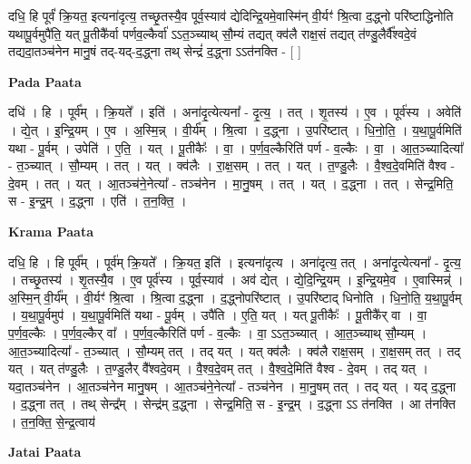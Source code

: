 \documentclass[17pt]{extarticle}
\begin{document}
दधि॒ हि पूर्वं॑ क्रि॒यत॒ इत्यना॑दृत्य॒ तच्छृ॒तस्यै॒व पूर्व॒स्याव॑ द्येदिन्द्रि॒यमे॒वास्मि॑न् वी॒र्यꣳ॑ श्रि॒त्वा द॒द्ध्नो परि॑ष्टाद्धिनोति यथापू॒र्वमुपै॑ति॒ यत् पू॒तीकै᳚र्वा पर्णव॒ल्कैर्वा॑ ऽऽत॒ञ्च्याथ् सौ॒म्यं तद्यत् क्व॑लै राक्ष॒सं तद्यत् त॑ण्डु॒लैर्वै᳚श्वदे॒वं तद्यदा॒तञ्च॑नेन मानु॒षं तद्-यद्-द॒द्ध्ना तथ् सेन्द्रं॑ द॒द्ध्ना ऽऽत॑नक्ति - [  ] \newline

\textbf{Pada Paata} \newline

दधि॑ । हि । पूर्व᳚म् । क्रि॒यते᳚ । इति॑ । अना॑दृ॒त्येत्यना᳚ - दृ॒त्य॒ । तत् । शृ॒तस्य॑ । ए॒व । पूर्व॑स्य । अवेति॑ । द्ये॒त् । इ॒न्द्रि॒यम् । ए॒व । अ॒स्मि॒न्न् । वी॒र्य᳚म् । श्रि॒त्वा । द॒द्ध्ना । उ॒परि॑ष्टात् । धि॒नो॒ति॒ । य॒था॒पू॒र्वमिति॑ यथा - पू॒र्वम् । उपेति॑ । ए॒ति॒ । यत् । पू॒तीकैः᳚ । वा॒ । प॒र्ण॒व॒ल्कैरिति॑ पर्ण - व॒ल्कैः । वा॒ । आ॒त॒ञ्च्यादित्या᳚ - त॒ञ्च्यात् । सौ॒म्यम् । तत् । यत् । क्व॑लैः । रा॒क्ष॒सम् । तत् । यत् । त॒ण्डु॒लैः । वै॒श्व॒दे॒वमिति॑ वैश्व - दे॒वम् । तत् । यत् । आ॒तञ्च॑ने॒नेत्या᳚ - तञ्च॑नेन । मा॒नु॒षम् । तत् । यत् । द॒द्ध्ना । तत् । सेन्द्र॒मिति॒ स - इ॒न्द्र॒म् । द॒द्ध्ना । एति॑ । त॒न॒क्ति॒ ।  \newline


\textbf{Krama Paata} \newline

दधि॒ हि । हि पूर्व᳚म् । पूर्व॑म् क्रि॒यते᳚ । क्रि॒यत॒ इति॑ । इत्यना॑दृत्य । अना॑दृत्य॒ तत् । अना॑दृ॒त्येत्यना᳚ - दृ॒त्य॒ । तच्छृ॒तस्य॑ । शृ॒तस्यै॒व । ए॒व पूर्व॑स्य । पूर्व॒स्याव॑ । अव॑ द्येत् । द्ये॒दि॒न्द्रि॒यम् । इ॒न्द्रि॒यमे॒व । ए॒वास्मिन्न्॑ । अ॒स्मि॒न् वी॒र्य᳚म् । वी॒र्यꣳ॑ श्रि॒त्वा । श्रि॒त्वा द॒द्ध्ना । द॒द्ध्नोपरि॑ष्टात् । उ॒परि॑ष्टाद् धिनोति । धि॒नो॒ति॒ य॒था॒पू॒र्वम् । य॒था॒पू॒र्वमुप॑ । य॒था॒पू॒र्वमिति॑ यथा - पू॒र्वम् । उपै॑ति । ए॒ति॒ यत् । यत् पू॒तीकैः᳚ । पू॒तीकै᳚र् वा । वा॒ प॒र्ण॒व॒ल्कैः । प॒र्ण॒व॒ल्कैर् वा᳚ । प॒र्ण॒व॒ल्कैरिति॑ पर्ण - व॒ल्कैः । वा॒ ऽऽत॒ञ्च्यात् । आ॒त॒ञ्च्याथ् सौ॒म्यम् । आ॒त॒ञ्च्यादित्या᳚ - त॒ञ्च्यात् । सौ॒म्यम् तत् । तद् यत् । यत् क्व॑लैः । क्व॑लै राक्ष॒सम् । रा॒क्ष॒सम् तत् । तद् यत् । यत् त॑ण्डु॒लैः । त॒ण्डु॒लैर् वै᳚श्वदे॒वम् । वै॒श्व॒दे॒वम् तत् । वै॒श्व॒दे॒मिति॑ वैश्व - दे॒वम् । तद् यत् । यदा॒तञ्च॑नेन । आ॒तञ्च॑नेन मानु॒षम् । आ॒तञ्च॑ने॒नेत्या᳚ - तञ्च॑नेन । मा॒नु॒षम् तत् । तद् यत् । यद् द॒द्ध्ना । द॒द्ध्ना तत् । तथ् सेन्द्र᳚म् । सेन्द्र॑म् द॒द्ध्ना । सेन्द्र॒मिति॒ स - इ॒न्द्र॒म् । द॒द्ध्ना ऽऽ त॑नक्ति । आ त॑नक्ति । त॒न॒क्ति॒ से॒न्द्र॒त्वाय॑ \newline

\textbf{Jatai Paata} \newline
\end{document}
